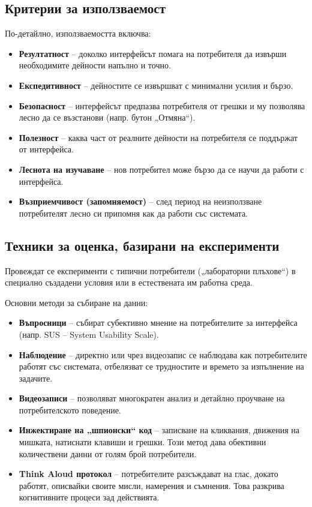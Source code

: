 \documentclass{scrartcl}
\begin{document}
\begin{FlushLeft}
\subsection{Критерии за използваемост}

По-детайлно, използваемостта включва:
\begin{itemize}
    \item \textbf{Резултатност} – доколко интерфейсът помага на потребителя да извърши необходимите дейности напълно и точно.
    \item \textbf{Експедитивност} – дейностите се извършват с минимални усилия и бързо.
    \item \textbf{Безопасност} – интерфейсът предпазва потребителя от грешки и му позволява лесно да се възстанови (напр. бутон „Отмяна“).
    \item \textbf{Полезност} – каква част от реалните дейности на потребителя се поддържат от интерфейса.
    \item \textbf{Леснота на изучаване} – нов потребител може бързо да се научи да работи с интерфейса.
    \item \textbf{Възприемчивост (запомняемост)} – след период на неизползване потребителят лесно си припомня как да работи със системата.
\end{itemize}

\subsection{Техники за оценка, базирани на експерименти}

Провеждат се експерименти с типични потребители („лабораторни плъхове“) в специално създадени условия или в естествената им работна среда.

Основни методи за събиране на данни:
\begin{itemize}
    \item \textbf{Въпросници} – събират субективно мнение на потребителите за интерфейса (напр. SUS – System Usability Scale).
    \item \textbf{Наблюдение} – директно или чрез видеозапис се наблюдава как потребителите работят със системата, отбелязват се трудностите и времето за изпълнение на задачите.
    \item \textbf{Видеозаписи} – позволяват многократен анализ и детайлно проучване на потребителското поведение.
    \item \textbf{Инжектиране на „шпионски“ код} – записване на кликвания, движения на мишката, натиснати клавиши и грешки. Този метод дава обективни количествени данни от голям брой потребители.
    \item \textbf{Think Aloud протокол} – потребителите разсъждават на глас, докато работят, описвайки своите мисли, намерения и съмнения. Това разкрива когнитивните процеси зад действията.
\end{itemize}


\end{FlushLeft}
\end{document}
